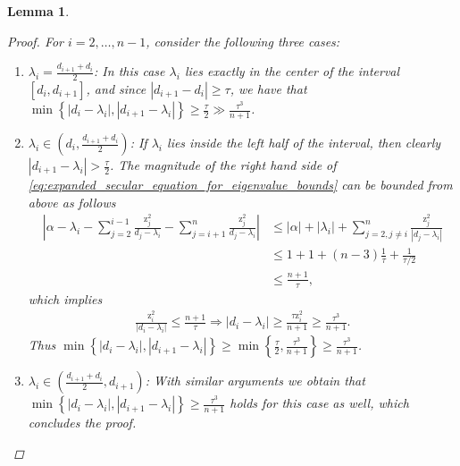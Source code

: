 \documentclass{article}
\newcommand{\labs}{\left|}
\newcommand{\rabs}{\right|}
\newcommand{\lcurly}{\left\{}
\newcommand{\rcurly}{\right\}}
\newtheorem{lemma}{Lemma}[section]
\newcommand\vecz{\boldsymbol{\mathrm{z}}}
\begin{document}
\begin{lemma}
\begin{proof}
    For $i=2,\ldots, n-1$, consider the following three cases:
    \begin{enumerate}
        \item $\lambda_i=\tfrac{d_{i+1}+d_i}{2}$: In this case $\lambda_i$ lies exactly in the center of the interval $[d_i,d_{i+1}]$, and since $|d_{i+1}-d_i|\geq \tau$, we have that $\min\lcurly
        \labs d_i-\lambda_i \rabs,
        \labs d_{i+1}-\lambda_i \rabs
        \rcurly
        \geq
        \frac{\tau}{2}\gg \frac{\tau^3}{n+1}$.
        \item $\lambda_i\in(d_i,\tfrac{d_{i+1}+d_i}{2})$: If $\lambda_i$ lies inside the left half of the interval, then clearly $|d_{i+1}-\lambda_i|> \frac{\tau}{2}$. 
        The magnitude of the right hand side of \eqref{eq:expanded_secular_equation_for_eigenvalue_bounds} can be bounded from above as follows
        \begin{align*}
            \labs
                \alpha 
                - 
                \lambda_i 
                -
                \sum_{j=2}^{i-1}
                \tfrac{\vecz_j^2}{d_j-\lambda_i}
                -
                \sum_{j=i+1}^{n}
                \tfrac{\vecz_j^2}{d_j-\lambda_i}
            \rabs
            &\leq
            |\alpha| + |\lambda_i| + \sum_{j=2,j\neq i}^n\tfrac{\vecz_j^2}{|d_j-\lambda_i|}\\
            &\leq
            1 + 1 + (n-3)\tfrac{1}{\tau} + \tfrac{1}{\tau/2}\\
            &\leq \tfrac{n+1}{\tau},
        \end{align*}
        which implies
        \begin{align*}
            \tfrac{\vecz_i^2}{|d_i-\lambda_i|} \leq \tfrac{n+1}{\tau}
            \Rightarrow
            |d_i-\lambda_i| \geq \tfrac{\tau\vecz_i^2}{n+1} \geq \tfrac{\tau^3}{n+1}.
        \end{align*}
        Thus $\min\lcurly
        \labs d_i-\lambda_i \rabs,
        \labs d_{i+1}-\lambda_i \rabs
        \rcurly
        \geq
        \min\lcurly
        \tfrac{\tau}{2},
        \tfrac{\tau^3}{n+1}
        \rcurly
        \geq
        \tfrac{\tau^3}{n+1}
        $.
        \item $\lambda_i\in(\tfrac{d_{i+1}+d_i}{2}, d_{i+1})$: With similar arguments we obtain that $\min\lcurly
        \labs d_i-\lambda_i \rabs,
        \labs d_{i+1}-\lambda_i \rabs
        \rcurly
        \geq
        \tfrac{\tau^3}{n+1}
        $ holds for this case as well, which concludes the proof.
    \end{enumerate}
\end{proof}
\end{lemma}
\end{document}
